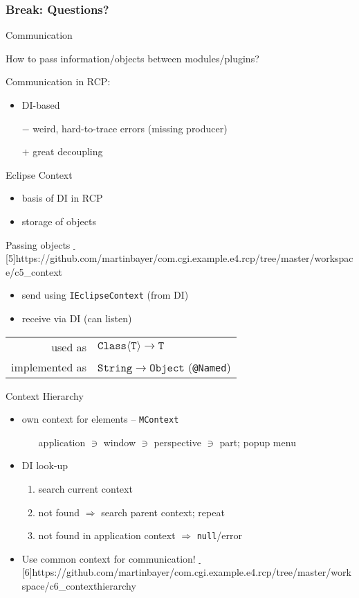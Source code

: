 \documentclass{beamer}
\makeatletter
\newcommand{\@eg}{\raisebox{-0.5mm}{\HandRight}}
\newcommand{\ice@eg}[2][]{\textcolor{ice}{\href{#2}{\@eg\,#1}}}
\newcommand{\pmp@eg}[2][]{\textcolor{pumpkin}{\href{#2}{\@eg\,#1}}}
\def\eg{\@ifstar\ice@eg\pmp@eg}
\newcommand{\str}[1]{\structure{#1}}
\newcommand{\breakframe}{\begin{fillerframe}\frametitle{Break: Questions?}\end{fillerframe}}
\newenvironment{centerblock}{\begin{block}{}\begin{center}}{\end{center}\end{block}}
\newcommand{\ttt}[1]{\texttt{\color{honey}#1}}
\newcommand{\mtt}[1]{\ensuremath{\mathtt{#1}}}
\newcommand{\singleindent}[1]{\begin{itemize}\item[] #1\end{itemize}}
\makeatother
\begin{document}
\breakframe

\begin{frame}{Communication}%
	\begin{centerblock}How to pass information/objects between modules/plugins?\end{centerblock}

	\medskip

	Communication in RCP:
	\begin{itemize}
		\item DI-based
		\item[$-$] weird, hard-to-trace errors (missing producer)
		\item[$+$] great decoupling
	\end{itemize}
\end{frame}%
\begin{frame}{Eclipse Context}%
	\begin{itemize}
		\item basis of DI in RCP
		\item storage of objects
	\end{itemize}
	Passing objects \eg[5]{https://github.com/martinbayer/com.cgi.example.e4.rcp/tree/master/workspace/c5_context}
	\begin{itemize}
		\item send using \ttt{IEclipseContext} (from DI)
		\item receive via DI (can listen)
	\end{itemize}
	\begin{centerblock}\begin{tabular}{rl}
		used as & $\mtt{Class\langle T\rangle}\to\mtt{T}$\\
		implemented as & $\mtt{String} \to \mtt{Object}$ (\ttt{@Named})\\
	\end{tabular}\end{centerblock}
\end{frame}%
\begin{frame}{Context Hierarchy}%
	\begin{itemize}
		\item own context for \str{app model} elements -- \ttt{MContext}\\
			\singleindent{application $\ni$ window $\ni$ perspective $\ni$ part; popup menu}

		\item DI look-up %
			\begin{enumerate}
				\item search current context
				\item not found $\Rightarrow$ search parent context; \alert{repeat}
				\item not found in application context $\Rightarrow$ \texttt{null}/error
			\end{enumerate}

		\item \alert{Use common context for communication!} \eg[6]{https://github.com/martinbayer/com.cgi.example.e4.rcp/tree/master/workspace/c6_contexthierarchy}
	\end{itemize}
\end{frame}%
\end{document}
